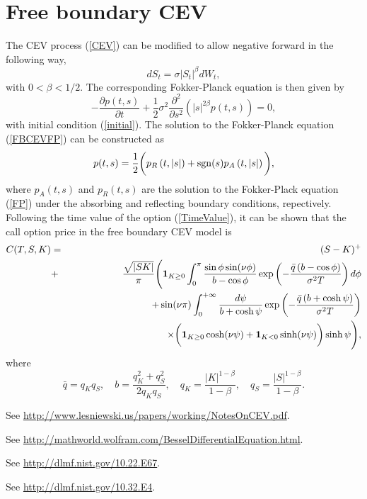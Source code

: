 \documentclass[12pt]{article}
\begin{document}
\section{Free boundary CEV}

  The CEV process (\ref{CEV}) can be modified to allow negative forward in the following way,
  \begin{equation}
    dS_t=\sigma \left|S_t\right|^{\beta}dW_t,
    \label{FreeBoundaryCEV}
  \end{equation}
  with $0<\beta<1/2$. The corresponding Fokker-Planck equation is then given by
  \begin{equation}
    -\frac{\partial p(t,s)}{\partial t}+\frac{1}{2}\sigma^2\frac{\partial^2}{\partial s^2}
    \left(\left|s\right|^{2\beta}p(t,s)\right) = 0,
    \label{FBCEVFP}
  \end{equation}
  with initial condition (\ref{initial}). The solution to the Fokker-Planck equation (\ref{FBCEVFP})
  can be constructed as
  \begin{equation}
    p(t,s)=\frac{1}{2}\bigg(p_R\left(t,\left|s\right|\right)+{\rm sgn}(s)p_A\left(t,\left|s\right|\right)\bigg),
  \end{equation}
  where $p_A(t,s)$ and $p_R(t,s)$ are the solution to the Fokker-Plack equation (\ref{FP}) under
  the absorbing and reflecting boundary conditions, repectively. Following the time value of the option (\ref{TimeValue}),
  it can be shown that the call option price in the free boundary CEV model is
  \begin{eqnarray}
    C(T,S,K) &=& (S-K)^+ \nonumber\\
             &+&\frac{\sqrt{\left|SK\right|}}{\pi}\Bigg({\bf 1}_{K\geq 0}\int_0^{\pi}\frac{\sin\phi\sin(\nu\phi)}{b-\cos\phi}
                        \exp\left(-\frac{\bar{q}\left(b-\cos\phi\right)}{\sigma^2T}\right)d\phi\nonumber\\
             &&\quad\quad\quad\quad\quad + \sin(\nu\pi)\int_0^{+\infty}
                \frac{d\psi}{b+\cosh \psi}
       \exp\left(-\frac{\bar{q}\left(b+\cosh \psi\right)}{\sigma^2T}\right)\nonumber\\
             &&\quad\quad\quad\quad\quad\quad\quad\quad\quad\quad \times
                  \bigg({\bf 1}_{K\geq 0}\cosh(\nu \psi)+{\bf 1}_{K< 0}\sinh(\nu \psi)\bigg)\sinh \psi\Bigg),
  \end{eqnarray}
  where
  \begin{equation}
    \bar{q}=q_Kq_S,\quad b=\frac{q_K^2+q_S^2}{2q_Kq_S},\quad q_K=\frac{|K|^{1-\beta}}{1-\beta},
    \quad q_S=\frac{|S|^{1-\beta}}{1-\beta}.
  \end{equation}



\begin{thebibliography}{99}
    See \url{http://www.lesniewski.us/papers/working/NotesOnCEV.pdf}.

    See \url{http://mathworld.wolfram.com/BesselDifferentialEquation.html}.

    See \url{http://dlmf.nist.gov/10.22.E67}.

    See \url{http://dlmf.nist.gov/10.32.E4}.
\end{thebibliography}
\end{document}
